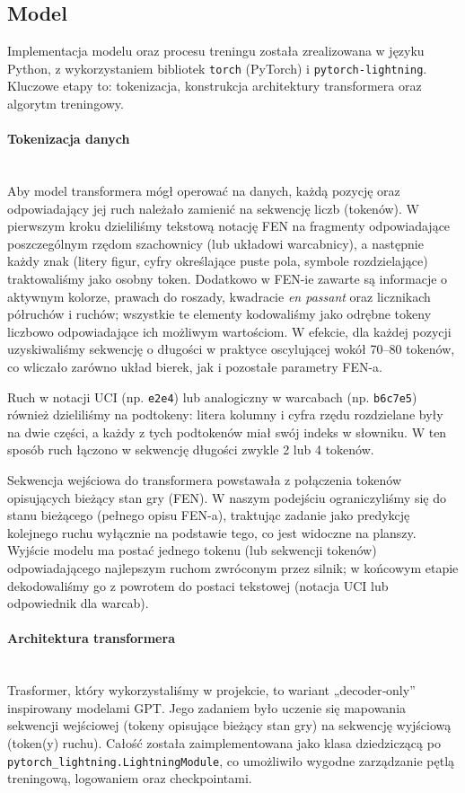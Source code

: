 \documentclass[12pt]{article}
\begin{document}
\subsection{Model}
Implementacja modelu oraz procesu treningu została zrealizowana w języku Python, z wykorzystaniem bibliotek \texttt{torch} (PyTorch) i \texttt{pytorch-lightning}. Kluczowe etapy to: tokenizacja, konstrukcja architektury transformera oraz algorytm treningowy.

\paragraph{Tokenizacja danych}
\\Aby model transformera mógł operować na danych, każdą pozycję oraz odpowiadający jej ruch należało zamienić na sekwencję liczb (tokenów). W pierwszym kroku dzieliliśmy tekstową notację FEN na fragmenty odpowiadające poszczególnym rzędom szachownicy (lub układowi warcabnicy), a następnie każdy znak (litery figur, cyfry określające puste pola, symbole rozdzielające) traktowaliśmy jako osobny token. Dodatkowo w FEN-ie zawarte są informacje o aktywnym kolorze, prawach do roszady, kwadracie \emph{en passant} oraz licznikach półruchów i ruchów; wszystkie te elementy kodowaliśmy jako odrębne tokeny liczbowo odpowiadające ich możliwym wartościom. W efekcie, dla każdej pozycji uzyskiwaliśmy sekwencję o długości w praktyce oscylującej wokół 70–80 tokenów, co wliczało zarówno układ bierek, jak i pozostałe parametry FEN-a.

Ruch w notacji UCI (np. \texttt{e2e4}) lub analogiczny w warcabach (np. \texttt{b6c7e5}) również dzieliliśmy na podtokeny: litera kolumny i cyfra rzędu rozdzielane były na dwie części, a każdy z tych podtokenów miał swój indeks w słowniku. W ten sposób ruch łączono w sekwencję długości zwykle 2 lub 4 tokenów. 

Sekwencja wejściowa do transformera powstawała z połączenia tokenów opisujących bieżący stan gry (FEN). W naszym podejściu ograniczyliśmy się do stanu bieżącego (pełnego opisu FEN-a), traktując zadanie jako predykcję kolejnego ruchu wyłącznie na podstawie tego, co jest widoczne na planszy. Wyjście modelu ma postać jednego tokenu (lub sekwencji tokenów) odpowiadającego najlepszym ruchom zwróconym przez silnik; w końcowym etapie dekodowaliśmy go z powrotem do postaci tekstowej (notacja UCI lub odpowiednik dla warcab).




\paragraph{Architektura transformera}
\\Trasformer, który wykorzystaliśmy w projekcie, to wariant „decoder‐only” inspirowany modelami GPT. Jego zadaniem było uczenie się mapowania sekwencji wejściowej (tokeny opisujące bieżący stan gry) na sekwencję wyjściową (token(y) ruchu). Całość została zaimplementowana jako klasa dziedziczącą po \\\texttt{pytorch\_lightning.LightningModule}, co umożliwiło wygodne zarządzanie pętlą treningową, logowaniem oraz checkpointami.
\end{document}
